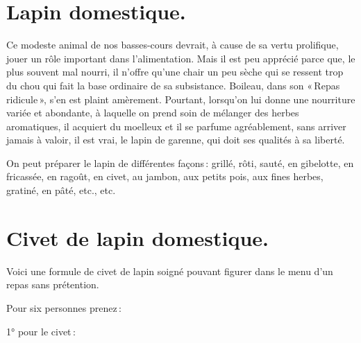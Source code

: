 \section*{\centering Lapin domestique.}
{}

Ce modeste animal de nos basses-cours devrait, à cause de sa vertu prolifique,
jouer un rôle important dans l'alimentation. Mais il est peu apprécié parce
que, le plus souvent mal nourri, il n'offre qu'une chair un peu sèche qui se
ressent trop du chou qui fait la base ordinaire de sa subsistance. Boileau,
dans son « Repas ridicule », s'en est plaint amèrement. Pourtant, lorsqu'on lui
donne une nourriture variée et abondante, à laquelle on prend soin de mélanger
des herbes aromatiques, il acquiert du moelleux et il se parfume agréablement,
sans arriver jamais à valoir, il est vrai, le lapin de garenne, qui doit ses
qualités à sa liberté.

\medskip

On peut préparer le lapin de différentes façons : grillé, rôti, sauté, en
gibelotte, en fricassée, en ragoût, en civet, au jambon, aux petits pois, aux
fines herbes, gratiné, en pâté, etc., etc.

\section*{\centering Civet de lapin domestique.}
{}

Voici une formule de civet de lapin soigné pouvant figurer dans le menu d'un
repas sans prétention.

Pour six personnes prenez :

\smallskip

1° pour le civet :

